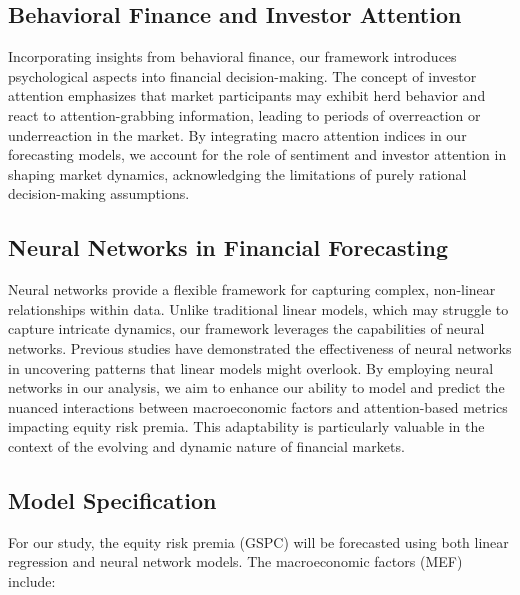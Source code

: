 \documentclass{article}
\begin{document}
\subsection{Behavioral Finance and Investor Attention}

Incorporating insights from behavioral finance, our framework introduces psychological aspects into financial decision-making. The concept of investor attention emphasizes that market participants may exhibit herd behavior and react to attention-grabbing information, leading to periods of overreaction or underreaction in the market. By integrating macro attention indices in our forecasting models, we account for the role of sentiment and investor attention in shaping market dynamics, acknowledging the limitations of purely rational decision-making assumptions.

\subsection{Neural Networks in Financial Forecasting}

Neural networks provide a flexible framework for capturing complex, non-linear relationships within data. Unlike traditional linear models, which may struggle to capture intricate dynamics, our framework leverages the capabilities of neural networks. Previous studies have demonstrated the effectiveness of neural networks in uncovering patterns that linear models might overlook. By employing neural networks in our analysis, we aim to enhance our ability to model and predict the nuanced interactions between macroeconomic factors and attention-based metrics impacting equity risk premia. This adaptability is particularly valuable in the context of the evolving and dynamic nature of financial markets.


\subsection{Model Specification}

For our study, the equity risk premia (GSPC) will be forecasted using both linear regression and neural network models. The macroeconomic factors (MEF) include:
\end{document}
